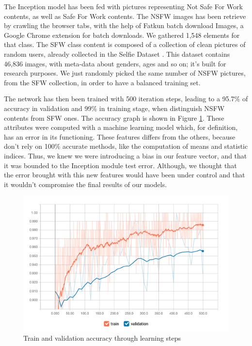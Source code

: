 The Inception model has been fed with pictures representing Not Safe For Work contents, as well as Safe For Work contents.
The NSFW images has been retrieve by crawling the browser tabs, with the help of Fatkun batch download Images, a Google Chrome extension for batch downloads.
We gathered 1,548 elements for that class.
The SFW class content is composed of a collection of clean pictures of random users, already collected in the Selfie Dataset \cite{selfie}. This dataset contains 46,836 images, with meta-data about genders, ages and so on; it's built for research purposes.
We just randomly picked the same number of NSFW pictures, from the SFW collection, in order to have a balanced training set.

The network has then been trained with 500 iteration steps, leading to a  95.7\% of accuracy in validation and 99\% in training stage, when distinguish NSFW contents from SFW ones. The accuracy graph is shown in Figure \ref{fig:inception}.
These attributes were computed with a machine learning model which, for definition, has an error in its functioning. These features differs from the others, because don't rely on 100\% accurate methods, like the computation of means and statistic indices. Thus, we knew we were introducing a bias in our feature vector, and that it was bounded to the Inception module test error. Although, we thought that the error brought with this new features would have been under control and that it wouldn't compromise the final results of our models.

\begin{figure}[htp!]
	\centering
	\includegraphics[width=\columnwidth]{chapter4/figure/inception.jpg}
	\caption{Train and validation accuracy through learning steps}
	\label{fig:inception}
\end{figure}

